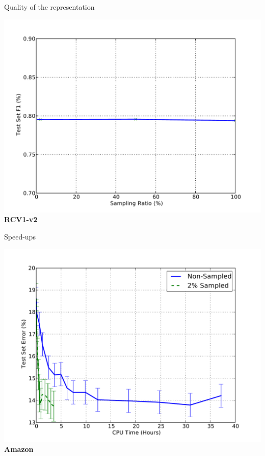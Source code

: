 \documentclass{beamer}
\begin{document}
\begin{frame}{Quality of the representation}
\begin{center}
\begin{minipage}{.7\textwidth}
\begin{center}
  \includegraphics[width=.95\textwidth]{images/rcv1_generalization.pdf}\\
  {\bf RCV1-v2}
\end{center}
\end{minipage}
\end{center}
\end{frame}

\begin{frame}{Speed-ups}
\begin{center}
\begin{minipage}{.7\textwidth}
\begin{center}
  \includegraphics[width=.95\textwidth]{images/amazon_speedup.pdf}\\
  {\bf Amazon}
\end{center}
\end{minipage}
\end{center}
\end{frame}
\end{document}
